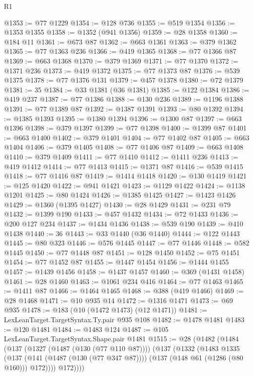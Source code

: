 \begin{lexlean}{R1}
\begin{coremodule}
@1353 := @77 @1229
@1354 := @128 @736
@1355 := @519 @1354
@1356 := @1353 @1355
@1358 := @1352 (@941 @1356)
@1359 := @28 @1358
@1360 := @184 @11
@1361 := @673 @87
@1362 := @663 @1361
@1363 := @379 @1362
@1365 := @77 @1363 @236
@1366 := @419 @1365
@1368 := @77 @1366 @87
@1369 := @663 @1368
@1370 := @379 @1369
@1371 := @77 @1370
@1372 := @1371 @236
@1373 := @419 @1372
@1375 := @77 @1373 @87
@1376 := @539 @1375
@1378 := @77 @1376 @131
@1379 := @457 @1378
@1380 := @72 @1379
@1381 := 35
@1384 := @33 @1381 (@36 @1381)
@1385 := @122 @1384
@1386 := @419 @237
@1387 := @77 @1386
@1388 := @130 @236
@1389 := @1196 @1388
@1391 := @77 @1389 @87
@1392 := @1387 @1391
@1393 := @80 @1392
@1394 := @1385 @1393
@1395 := @1380 @1394
@1396 := @1300 @87
@1397 := @663 @1396
@1398 := @379 @1397
@1399 := @77 @1398
@1400 := @1399 @87
@1401 := @663 @1400
@1402 := @379 @1401
@1404 := @77 @1402 @87
@1405 := @663 @1404
@1406 := @379 @1405
@1408 := @77 @1406 @87
@1409 := @663 @1408
@1410 := @379 @1409
@1411 := @77 @1410
@1412 := @1411 @236
@1413 := @419 @1412
@1414 := @77 @1413
@1415 := @1371 @87
@1416 := @539 @1415
@1418 := @77 @1416 @87
@1419 := @1414 @1418
@1420 := @130 @1419
@1421 := @125 @1420
@1422 := @941 @1421
@1423 := @1129 @1422
@1424 := @1138 @1201
@1425 := @80 @1424
@1426 := @1385 @1425
@1427 := @1423 @1426
@1429 := @1360 (@1395 @1427)
@1430 := @28 @1429
@1431 := @231 @79
@1432 := @1399 @190
@1433 := @457 @1432
@1434 := @72 @1433
@1436 := @200 @127 @234
@1437 := @1434 @1436
@1438 := @539 @190
@1439 := @410 @1438
@1440 := 36
@1443 := @33 @1440 (@36 @1440)
@1444 := @122 @1443
@1445 := @80 @323
@1446 := @576 @1445
@1447 := @77 @1446
@1448 := @582 @1445
@1450 := @77 @1448 @87
@1451 := @128 @1450
@1452 := @75 @1451
@1454 := @77 @1452 @87
@1455 := @1447 @1454
@1456 := @1444 @1455
@1457 := @1439 @1456
@1458 := @1437 @1457
@1460 := @369 (@1431 @1458)
@1461 := @28 @1460
@1463 := @1061 @234 @416
@1464 := @77 @1463
@1465 := @1411 @87
@1466 := @1464 @1465
@1468 := @388 (@419 @1466)
@1469 := @28 @1468
@1471 := @10 @935 @14
@1472 := @1316 @1471
@1473 := @69 @935
@1478 := @183 (@10 (@1472 @1473) (@12 @1471))
@1481 := LexLeanTarget.TargetSyntax.Ty.pair @935 @108
@1482 := @1478 @1481
@1483 := @120 @1481
@1484 := @1483 @124
@1487 := @105 LexLeanTarget.TargetSyntax.Shape.pair @1481
@1515 := @28
    (@1482
      (@1484
        (@137
          (@1327 (@1487 (@130 (@77 @110 @87))))
          (@137
            (@1332
              (@1483
                @1335
                (@137
                  (@141 (@1487 (@130 (@77 @347 @87))))
                  (@137 (@148 @61 (@1286 (@80 @160))) @172))))
            @172))))

\end{coremodule}
\end{lexlean}
